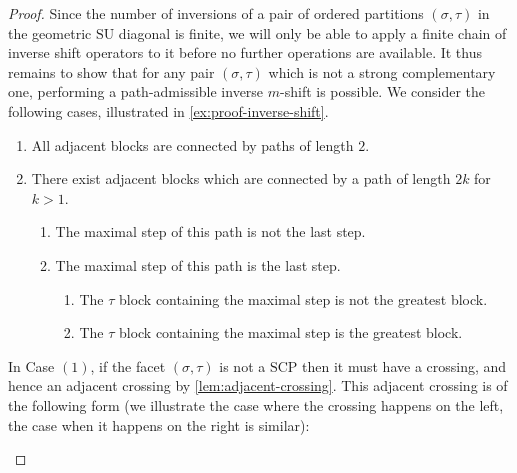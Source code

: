 \documentclass{amsart}
\theoremstyle{definition}
\newcommand{\SU}{\mathrm{SU}}
\newcommand{\SCP}{\mathrm{SCP}}
\begin{document}
\begin{proof}
Since the number of inversions of a pair of ordered partitions $(\sigma,\tau)$ in the geometric $\SU$ diagonal is finite, we will only be able to apply a finite chain of inverse shift operators to it before no further operations are available. 
It thus remains to show that for any pair $(\sigma,\tau)$ which is not a strong complementary one, performing a path-admissible inverse $m$-shift is possible. 
We consider the following cases, illustrated in \cref{ex:proof-inverse-shift}.
\begin{enumerate}
	\item All adjacent blocks are connected by paths of length $2$.
	\item There exist adjacent blocks which are connected by a path of length $2k$ for $k>1$.
	\begin{enumerate}
		\item The maximal step of this path is not the last step.
		\item The maximal step of this path is the last step.
		\begin{enumerate}
			\item The $\tau$ block containing the maximal step is not the greatest block.
			\item The $\tau$ block containing the maximal step is the greatest block.
		\end{enumerate}
	\end{enumerate}
\end{enumerate}
In Case $(1)$, if the facet $(\sigma,\tau)$ is not a $\SCP$ then it must have a crossing, and hence an adjacent crossing by \cref{lem:adjacent-crossing}. 
This adjacent crossing is of the following form (we illustrate the case where the crossing happens on the left, the case when it happens on the right is similar): 
\begin{center}
\quad
{}
\quad
\begin{tikzpicture}[scale=.6]  

\end{tikzpicture}
\end{center}
\end{proof}
\end{document}
